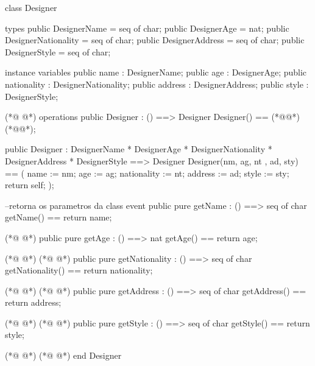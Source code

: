 \begin{vdmpp}[breaklines=true]
class Designer

types
 public DesignerName = seq of char;
 public DesignerAge = nat;
 public DesignerNationality = seq of char;
 public DesignerAddress = seq of char;
 public DesignerStyle = seq of char;
 
instance variables
 public name : DesignerName;
 public age : DesignerAge;
 public nationality : DesignerNationality;
 public address : DesignerAddress;
 public style : DesignerStyle;
 
(*@
\label{Designer:17}
@*)
 operations
 public Designer : () ==> Designer
   Designer() == (*@@*) (*@@*);
  
  public Designer : 
          DesignerName * 
          DesignerAge *
          DesignerNationality * 
          DesignerAddress * 
          DesignerStyle   ==> Designer
  Designer(nm, ag, nt , ad, sty) ==
  (
    name := nm;
    age := ag;
    nationality := nt;
    address := ad;
    style := sty;
    return self;
  );
  
  --retorna os parametros da class event
  public pure getName : () ==> seq of char
    getName() == return name;
    
(*@
\label{getName:41}
@*)
   public pure getAge : () ==> nat
     getAge() == return age;
     
(*@
\label{getDate:44}
@*)
(*@
\label{getAge:44}
@*)
  public pure getNationality : () ==> seq of char
     getNationality() == return nationality;
     
(*@
\label{getLocal:47}
@*)
(*@
\label{getNationality:47}
@*)
  public pure getAddress : () ==> seq of char
     getAddress() == return address;      
     
(*@
\label{getTime:50}
@*)
(*@
\label{getAddress:50}
@*)
  public pure getStyle : () ==> seq of char
     getStyle() == return style;
     
(*@
\label{getStyle:53}
@*)
(*@
\label{getDuration:53}
@*)
end Designer
\end{vdmpp}
\bigskip
